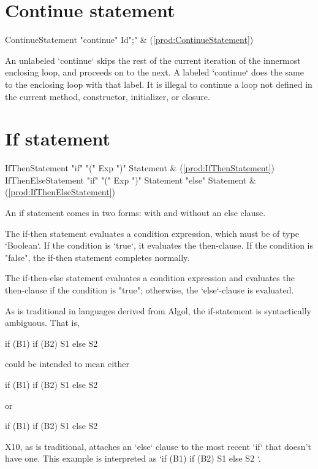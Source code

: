 \section{Continue statement}

\begin{bbgrammar}
 ContinueStatement    \: \xcd"continue" Id\opt \xcd";" & (\ref{prod:ContinueStatement})\\%
\end{bbgrammar}

An unlabeled \xcd`continue` skips the rest of the current iteration of the
innermost enclosing loop, and proceeds on to the next.  A labeled
\xcd`continue` does the same to the enclosing loop with that label.
It is illegal to continue a loop not defined in the current
method, constructor, initializer, or closure.

\section{If statement}

\begin{bbgrammar}
 IfThenStatement    \: \xcd"if" \xcd"(" Exp \xcd")" Statement & (\ref{prod:IfThenStatement})\\%
 IfThenElseStatement    \: \xcd"if" \xcd"(" Exp \xcd")" Statement  \xcd"else" Statement  & (\ref{prod:IfThenElseStatement})\\%
\end{bbgrammar}

An if statement comes in two forms: with and without an else
clause.

The if-then statement evaluates a condition expression, which must be of type
\xcd`Boolean`. If the condition is \xcd`true`, it evaluates the then-clause.
If the condition is \xcd"false", the if-then statement completes normally.

The if-then-else statement evaluates a condition expression and 
evaluates the then-clause if the condition is
\xcd"true"; otherwise, the \xcd`else`-clause is evaluated.

As is traditional in languages derived from Algol, the if-statement is syntactically
ambiguous.  That is, 
\begin{xten}
if (B1) if (B2) S1 else S2
\end{xten}
could be intended to mean either 
\begin{xten}
if (B1) { if (B2) S1 else S2 }
\end{xten} 
or 
\begin{xten}
if (B1) {if (B2) S1} else S2
\end{xten}
X10, as is traditional, attaches an \xcd`else` clause to the most recent
\xcd`if` that doesn't have one.
This example is interpreted as 
\xcd`if (B1) { if (B2) S1 else S2 }`. 



